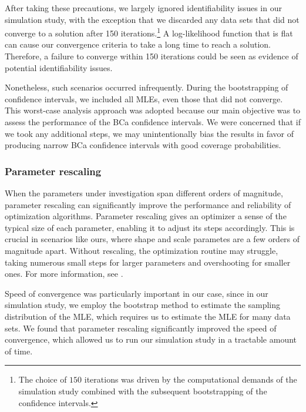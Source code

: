 \documentclass[
]{article}
\begin{document}
After taking these precautions, we largely ignored identifiability
issues in our simulation study, with the exception that we discarded any
data sets that did not converge to a solution after 150
iterations.\footnote{The choice of $150$ iterations was driven by the computational demands of the
simulation study combined with the subsequent bootstrapping of the confidence intervals.
} A log-likelihood function that is flat can cause our convergence
criteria to take a long time to reach a solution. Therefore, a failure
to converge within 150 iterations could be seen as evidence of potential
identifiability issues.

Nonetheless, such scenarios occurred infrequently. During the
bootstrapping of confidence intervals, we included all MLEs, even those
that did not converge. This worst-case analysis approach was adopted
because our main objective was to assess the performance of the BCa
confidence intervals. We were concerned that if we took any additional
steps, we may unintentionally bias the results in favor of producing
narrow BCa confidence intervals with good coverage probabilities.

\hypertarget{parameter-rescaling}{%
\subsubsection*{Parameter rescaling}\label{parameter-rescaling}}

When the parameters under investigation span different orders of
magnitude, parameter rescaling can significantly improve the performance
and reliability of optimization algorithms. Parameter rescaling gives an
optimizer a sense of the typical size of each parameter, enabling it to
adjust its steps accordingly. This is crucial in scenarios like ours,
where shape and scale parametes are a few orders of magnitude apart.
Without rescaling, the optimization routine may struggle, taking
numerous small steps for larger parameters and overshooting for smaller
ones. For more information, see \citep{nocedal2006numerical}.

Speed of convergence was particularly important in our case, since in
our simulation study, we employ the bootstrap method to estimate the
sampling distribution of the MLE, which requires us to estimate the MLE
for many data sets. We found that parameter rescaling significantly
improved the speed of convergence, which allowed us to run our
simulation study in a tractable amount of time.
\end{document}
